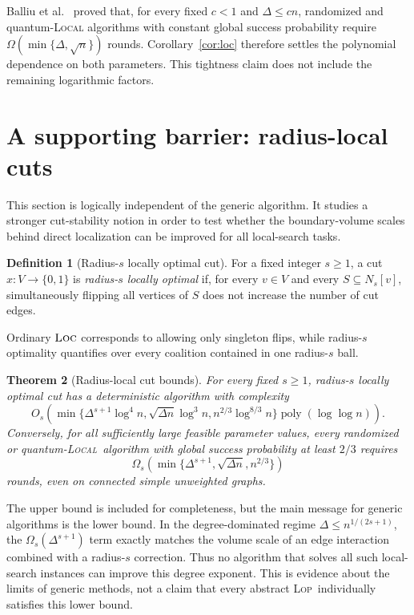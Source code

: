 \documentclass[11pt]{article}
\newtheorem{theorem}{Theorem}[section]
\theoremstyle{definition}
\newtheorem{definition}[theorem]{Definition}
\theoremstyle{remark}
\newcommand{\poly}{\operatorname{poly}}
\newcommand{\N}{N}
\newcommand{\LOC}{\textnormal{\textsc{Loc}}}
\newcommand{\LOP}{\textnormal{\textsc{Lop}}}
\newcommand{\LOCAL}{\textnormal{\textsc{Local}}}
\begin{document}
Balliu et al.~\cite[Theorem~5.2 and Corollary~5.6]{BalliuEtAl2026} proved that, for
every fixed $c<1$ and $\Delta\leq cn$, randomized and quantum-\LOCAL
algorithms with constant global success probability require
$\Omega(\min\{\Delta,\sqrt n\})$ rounds.  Corollary~\ref{cor:loc} therefore settles
the polynomial dependence on both parameters.  This tightness claim does not include
the remaining logarithmic factors.

\section{A supporting barrier: radius-local cuts}

This section is logically independent of the generic algorithm.  It studies a
stronger cut-stability notion in order to test whether the boundary-volume scales
behind direct localization can be improved for all local-search tasks.

\begin{definition}[Radius-$s$ locally optimal cut]
For a fixed integer $s\geq1$, a cut $x:V\to\{0,1\}$ is \emph{radius-$s$ locally
optimal} if, for every $v\in V$ and every $S\subseteq\N_s[v]$, simultaneously
flipping all vertices of $S$ does not increase the number of cut edges.
\end{definition}

Ordinary $\LOC$ corresponds to allowing only singleton flips, while radius-$s$
optimality quantifies over every coalition contained in one radius-$s$ ball.

\begin{theorem}[Radius-local cut bounds]\label{thm:radius-cut}
For every fixed $s\geq1$, radius-$s$ locally optimal cut has a deterministic
algorithm with complexity
\begin{equation}\label{eq:radius-upper}
 O_s\!\left(
 \min\{\Delta^{s+1}\log^4 n,
        \sqrt{\Delta n}\log^3 n,
        n^{2/3}\log^{8/3}n\}
 \poly(\log\log n)
 \right).
\end{equation}
Conversely, for all sufficiently large feasible parameter values, every randomized
or quantum-\LOCAL\ algorithm with global success probability at least $2/3$
requires
\begin{equation}\label{eq:radius-lower}
 \Omega_s\!\left(
 \min\{\Delta^{s+1},\sqrt{\Delta n},n^{2/3}\}
 \right)
\end{equation}
rounds, even on connected simple unweighted graphs.
\end{theorem}

The upper bound is included for completeness, but the main message for generic
algorithms is the lower bound.  In the degree-dominated regime
$\Delta\leq n^{1/(2s+1)}$, the $\Omega_s(\Delta^{s+1})$ term exactly matches the
volume scale of an edge interaction combined with a radius-$s$ correction.  Thus no
algorithm that solves all such local-search instances can improve this degree
exponent.  This is evidence about the limits of generic methods, not a claim that
every abstract \LOP\ individually satisfies this lower bound.
\end{document}
